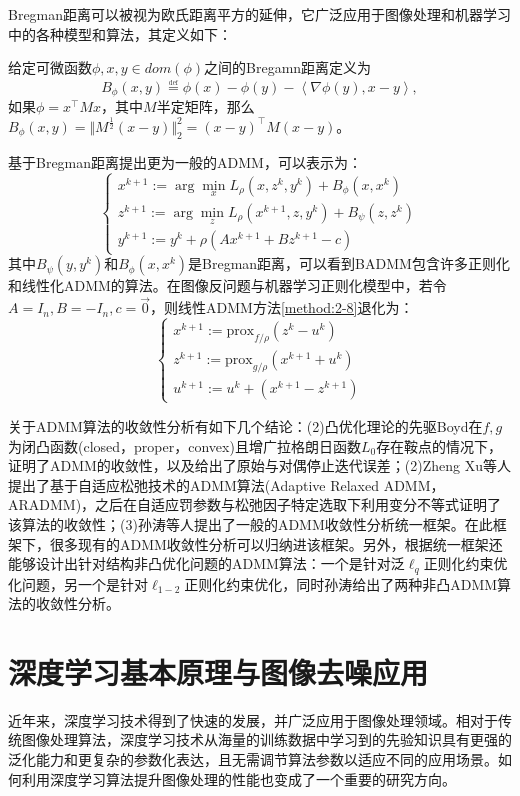 Bregman距离可以被视为欧氏距离平方的延伸，它广泛应用于图像处理和机器学习中的各种模型和算法，其定义如下：
\begin{definition}\label{def:2-6}
	给定可微函数$\phi,x,y\in{dom(\phi)}$之间的Bregamn距离定义为
	\begin{equation}
		B_{\phi}(x,y)\overset{\underset{\mathrm{def}}{}}{=}\phi(x)-\phi(y)-\left<\nabla\phi(y),x-y\right>,
	\end{equation}
	如果$\phi=x^\top{M}x$，其中$M$半定矩阵，那么$B_\phi(x,y)=\Vert{M^{\frac{1}{2}}(x-y)}\Vert^2_2=(x-y)^\top{M(x-y)}$。
\end{definition}
基于Bregman距离提出更为一般的ADMM，可以表示为：
\begin{equation}\label{method:2-9}
	\begin{cases}
		x^{k+1}:=\arg\min_{x}{L_{\rho}(x,z^k,y^k)+B_\phi(x,x^k)} \\
		z^{k+1}:=\arg\min_{z}{L_{\rho}(x^{k+1},z,y^k)+B_\psi{(z,z^k)}} \\
		y^{k+1}:=y^k+\rho{(Ax^{k+1}+Bz^{k+1}-c)}
	\end{cases}
\end{equation}
其中$B_\psi(y,y^k)$和$B_\phi(x,x^k)$是Bregman距离，可以看到BADMM包含许多正则化和线性化ADMM的算法。在图像反问题与机器学习正则化模型中，若令$A=I_n,B=-I_n,c=\vec{0}$，则线性ADMM方法\eqref{method:2-8}退化为：
\begin{equation}\label{method:2-10}
	\begin{cases}
		x^{k+1}:=\text{prox}_{f/\rho}(z^k − u^k) \\
		z^{k+1}:=\text{prox}_{g/\rho}(x^{k+1} + u^k) \\
		u^{k+1}:=u^k+(x^{k+1}-z^{k+1})
	\end{cases}
\end{equation}

关于ADMM算法的收敛性分析有如下几个结论：(2)凸优化理论的先驱Boyd在$f,g$为闭凸函数(closed，proper，convex)且增广拉格朗日函数$L_0$存在鞍点的情况下，证明了ADMM的收敛性，以及给出了原始与对偶停止迭代误差\supercite{Stephen1}；(2)Zheng Xu等人提出了基于自适应松弛技术的ADMM算法(Adaptive Relaxed ADMM，ARADMM)，之后在自适应罚参数与松弛因子特定选取下利用变分不等式证明了该算法的收敛性\supercite{Xu}；(3)孙涛等人提出了一般的ADMM收敛性分析统一框架。在此框架下，很多现有的ADMM收敛性分析可以归纳进该框架。另外，根据统一框架还能够设计出针对结构非凸优化问题的ADMM算法：一个是针对泛$\ell_q$正则化约束优化问题，另一个是针对$\ell_{1-2}$正则化约束优化，同时孙涛给出了两种非凸ADMM算法的收敛性分析\supercite{SunTao}。

\section{深度学习基本原理与图像去噪应用}
近年来，深度学习技术得到了快速的发展，并广泛应用于图像处理领域。相对于传统图像处理算法，深度学习技术从海量的训练数据中学习到的先验知识具有更强的泛化能力和更复杂的参数化表达，且无需调节算法参数以适应不同的应用场景。如何利用深度学习算法提升图像处理的性能也变成了一个重要的研究方向。

